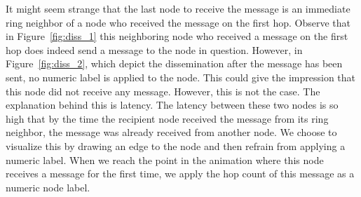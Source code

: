 It might seem strange that the last node to receive the message is an
immediate ring neighbor of a node who received the message on the first
hop. Observe that in Figure~\ref{fig:diss_1} this neighboring node who
received a message on the first hop does indeed send a message to the
node in question. However, in Figure~\ref{fig:diss_2}, which depict the
dissemination after the message has been sent, no numeric label is
applied to the node. This could give the impression that this node did
not receive any message. However, this is not the case. The explanation
behind this is latency. The latency between these two nodes is so high
that by the time the recipient node received the message from its ring
neighbor, the message was already received from another node. We choose
to visualize this by drawing an edge to the node and then refrain from
applying a numeric label. When we reach the point in the animation where
this node receives a message for the first time, we apply the hop count
of this message as a numeric node label.

